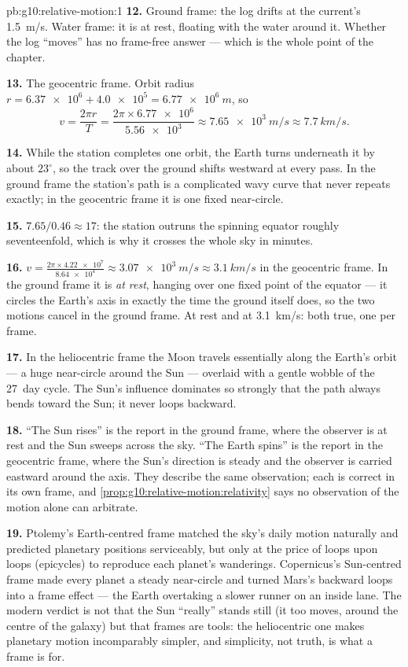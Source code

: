 \begin{solution}{pb:g10:relative-motion:1}
\textbf{12.} Ground frame: the log drifts at the current's
\qty{1.5}{m/s}. Water frame: it is at rest, floating with the water
around it. Whether the log ``moves'' has no frame-free answer --- which
is the whole point of the chapter.

\textbf{13.} The geocentric frame. Orbit radius
$r = \num{6.37e6} + \num{4.0e5} = \qty{6.77e6}{m}$, so
\[
v = \frac{2\pi r}{T} = \frac{2\pi \times \num{6.77e6}}{\num{5.56e3}}
\approx \qty{7.65e3}{m/s} \approx \qty{7.7}{km/s}.
\]

\textbf{14.} While the station completes one orbit, the Earth turns
underneath it by about $23^\circ$, so the track over the ground shifts
westward at every pass. In the ground frame the station's path is a
complicated wavy curve that never repeats exactly; in the geocentric
frame it is one fixed near-circle.

\textbf{15.} $7.65 / 0.46 \approx 17$: the station outruns the spinning
equator roughly seventeenfold, which is why it crosses the whole sky in
minutes.

\textbf{16.} $v = \frac{2\pi \times \num{4.22e7}}{\num{8.64e4}}
\approx \qty{3.07e3}{m/s} \approx \qty{3.1}{km/s}$ in the geocentric
frame. In the ground frame it is \emph{at rest}, hanging over one fixed
point of the equator --- it circles the Earth's axis in exactly the
time the ground itself does, so the two motions cancel in the ground
frame. At rest and at \qty{3.1}{km/s}: both true, one per frame.

\textbf{17.} In the heliocentric frame the Moon travels essentially
along the Earth's orbit --- a huge near-circle around the Sun ---
overlaid with a gentle wobble of the \qty{27}{day} cycle. The Sun's
influence dominates so strongly that the path always bends toward the
Sun; it never loops backward.

\textbf{18.} ``The Sun rises'' is the report in the ground frame, where
the observer is at rest and the Sun sweeps across the sky. ``The Earth
spins'' is the report in the geocentric frame, where the Sun's
direction is steady and the observer is carried eastward around the
axis. They describe the same observation; each is correct in its own
frame, and \cref{prop:g10:relative-motion:relativity} says no
observation of the motion alone can arbitrate.

\textbf{19.} Ptolemy's Earth-centred frame matched the sky's daily
motion naturally and predicted planetary positions serviceably, but
only at the price of loops upon loops (epicycles) to reproduce each
planet's wanderings. Copernicus's Sun-centred frame made every planet a
steady near-circle and turned Mars's backward loops into a frame
effect --- the Earth overtaking a slower runner on an inside lane. The
modern verdict is not that the Sun ``really'' stands still (it too
moves, around the centre of the galaxy) but that frames are tools: the
heliocentric one makes planetary motion incomparably simpler, and
simplicity, not truth, is what a frame is for.


\end{solution}
